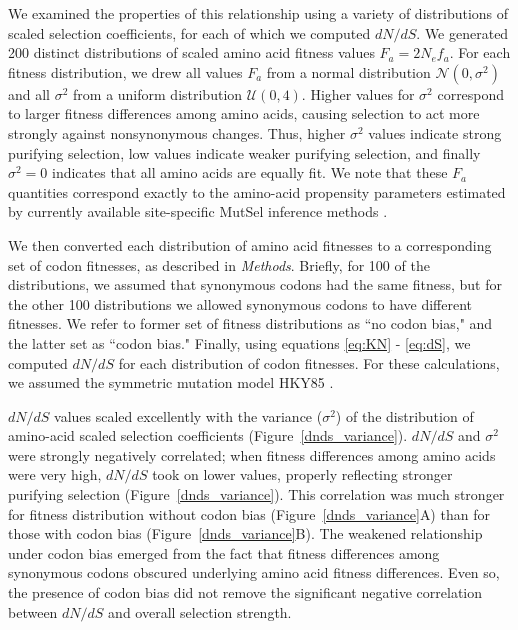 \documentclass[11pt]{article}
\begin{document}
We examined the properties of this relationship using a variety of distributions of scaled selection coefficients, for each of which we computed $dN/dS$. We generated 200 distinct distributions of scaled amino acid fitness values $F_a = 2N_ef_a$. For each fitness distribution, we drew all values $F_a$ from a normal distribution $\mathcal{N}(0,\sigma^2)$ and all $\sigma^2$ from a uniform distribution $\mathcal{U}(0,4)$. Higher values for $\sigma^2$ correspond to larger fitness differences among amino acids, causing selection to act more strongly against nonsynonymous changes. Thus, higher $\sigma^2$ values indicate strong purifying selection, low values indicate weaker purifying selection, and finally $\sigma^2 = 0$ indicates that all amino acids are equally fit. We note that these $F_a$ quantities correspond exactly to the amino-acid propensity parameters estimated by currently available site-specific MutSel inference methods \cite{RodrigueLartillot2014,Tamurietal2014}.

We then converted each distribution of amino acid fitnesses to a corresponding set of codon fitnesses, as described in \emph{Methods}. Briefly, for 100 of the distributions, we assumed that synonymous codons had the same fitness, but for the other 100 distributions we allowed synonymous codons to have different fitnesses. We refer to former set of fitness distributions as ``no codon bias," and the latter set as ``codon bias." Finally, using equations \eqref{eq:KN} - \eqref{eq:dS}, we computed $dN/dS$ for each distribution of codon fitnesses. For these calculations, we assumed the symmetric mutation model HKY85 \cite{HKY85}.

$dN/dS$ values scaled excellently with the variance ($\sigma^2$) of the distribution of amino-acid scaled selection coefficients (Figure~\ref{dnds_variance}). $dN/dS$ and $\sigma^2$ were strongly negatively correlated; when fitness differences among amino acids were very high, $dN/dS$ took on lower values, properly reflecting stronger purifying selection (Figure~\ref{dnds_variance}). This correlation was much stronger for fitness distribution without codon bias (Figure~\ref{dnds_variance}A) than for those with codon bias (Figure~\ref{dnds_variance}B). The weakened relationship under codon bias emerged from the fact that fitness differences among synonymous codons obscured underlying amino acid fitness differences. Even so, the presence of codon bias did not remove the significant negative correlation between $dN/dS$ and overall selection strength.
\end{document}
